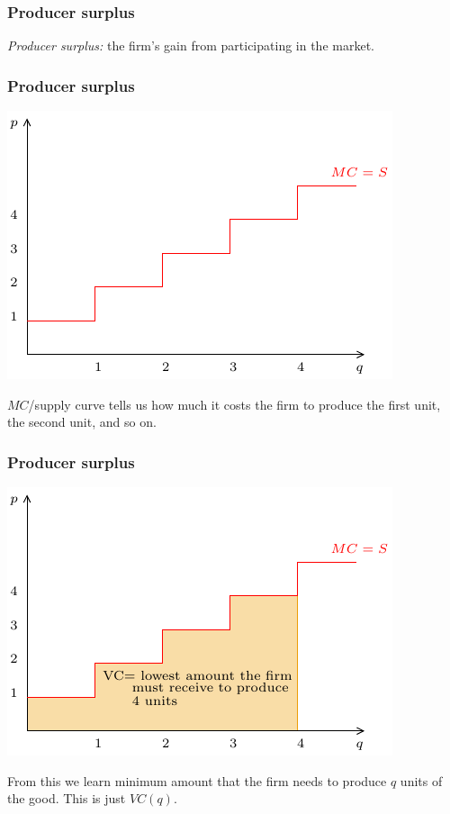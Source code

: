 \documentclass[xcolor=pdftex,dvipsnames]{beamer}
\begin{document}
\begin{frame}
\frametitle{Producer surplus}
\emph{Producer surplus:} the firm's gain from participating in the
market.

\bigskip
{}

\bigskip
{}

 
\end{frame}



\begin{frame}
\frametitle{Producer surplus}
\begin{center}
\includegraphics{pics/PS1}
\end{center}
$MC$/supply curve tells us how much it costs the firm to produce the
first unit, the second unit, and so on.
\end{frame}

\begin{frame}
\frametitle{Producer surplus}
\begin{center}
\includegraphics{pics/PS2}
\end{center}
From this we learn minimum amount that the firm needs to produce $q$
units of the good. This is just $VC(q)$.
\end{frame}
\end{document}
